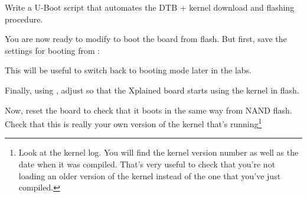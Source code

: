 Write a U-Boot script that automates the DTB + kernel download
and flashing procedure.

You are now ready to modify  to boot the board
from flash. But first, save the settings for booting from :


This will be useful to switch back to  booting mode
later in the labs.

Finally, using ,
adjust  so that the Xplained board starts
using the kernel in flash.

Now, reset the board to check that it boots
in the same way from NAND flash. Check that this is really your own version of
the kernel that's running\footnote{Look at the kernel log. You will find
the kernel version number as well as the date when it was compiled.
That's very useful to check that you're not loading an older version
of the kernel instead of the one that you've just compiled.}

